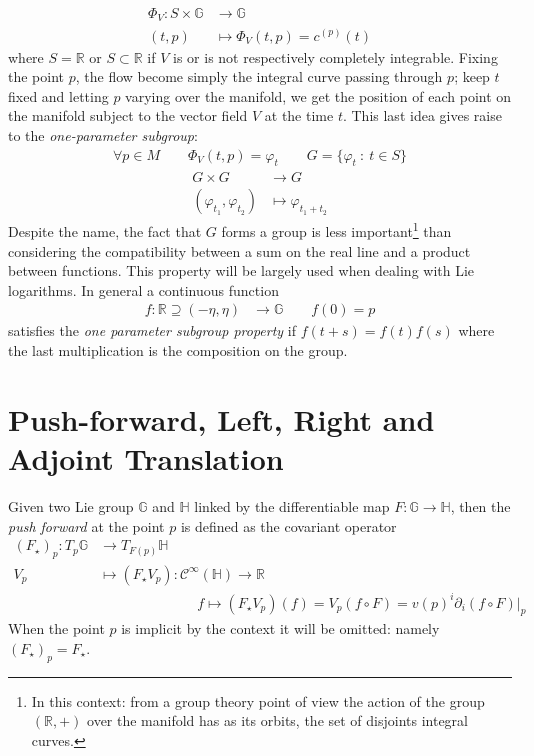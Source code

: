 \begin{align*}
\Phi_{V}: S\times \mathbb{G} &\longrightarrow \mathbb{G}   \\
(t,p) &\longmapsto  \Phi_{V}(t,p) = c^{(p)}(t)
\end{align*}
where $S = \mathbb{R} $ or $S\subset \mathbb{R}$ if $V$ is or is not respectively completely integrable. Fixing the point $p$, the flow become simply the integral curve passing through $p$; keep $t$ fixed and letting $p$ varying over the manifold, we get the position of each point on the manifold subject to the vector field $V$ at the time $t$. This last idea gives raise to the \emph{one-parameter subgroup}:
\begin{align*}
\forall p \in M \qquad \Phi_{V}(t,p) = \varphi_{t}  \qquad G = \{ \varphi_{t} ~:~ t \in S\}
\end{align*}
\begin{align*}
G\times G &\longrightarrow G   \\
(\varphi_{t_1} ,\varphi_{t_2} ) &\longmapsto  \varphi_{t_1 + t_2} 
\end{align*}
Despite the name, the fact that $G$ forms a group is less important\footnote{In this context: from a group theory point of view the action of the group $(\mathbb{R},+)$ over the manifold has as its orbits, the set of disjoints integral curves.} than considering the compatibility between a sum on the real line and a product between functions. This property will be largely used when dealing with Lie logarithms.
In general a continuous function
\begin{align*}
f : \mathbb{R}\supseteq (-\eta,\eta) & \longrightarrow \mathbb{G}  \qquad f(0) = p
\end{align*}
satisfies the \emph{one parameter subgroup property} if $f(t+s) = f(t) f(s)$ where the last multiplication is the composition on the group. 

\section{Push-forward, Left, Right and Adjoint Translation}

Given two Lie group $\mathbb{G}$ and $\mathbb{H}$ linked by the differentiable map $F:\mathbb{G}\rightarrow \mathbb{H}$, then the \emph{push forward} at the point $p$ is defined as the covariant operator
\begin{align*}
(F_{\star})_{p} : T_{p} \mathbb{G} & \longrightarrow  T_{F(p)}\mathbb{H}   \\
V_{p}  &\longmapsto  (F_{\star} V_{p})  : \mathcal{C}^{\infty}(\mathbb{H})  \longrightarrow   \mathbb{R} \\
& \qquad \qquad \qquad \quad f \longmapsto (F_{\star} V_{p})(f) = V_{p}(f\circ F) 
=
v(p)^{i} \partial_{i}(f\circ F)\bigr|_{p} 
\end{align*}
When the point $p$ is implicit by the context it will be omitted: namely $(F_{\star})_{p} = F_{\star}$. \\

